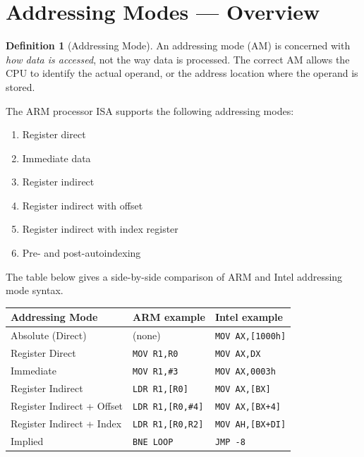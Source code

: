 \documentclass[11pt, a4paper, notitlepage]{report}
\theoremstyle{definition}
\newtheorem{definition}[theorem]{Definition}
\theoremstyle{remark}
\theoremstyle{definition}
\begin{document}
\section{Addressing Modes --- Overview}

\begin{definition}[Addressing Mode]
\label{def:addressing-mode}
An addressing mode (AM) is concerned with \emph{how data is accessed}, not the way data is processed. The correct AM allows the CPU to identify the actual operand, or the address location where the operand is stored.
\end{definition}

The ARM processor ISA supports the following addressing modes:

\begin{enumerate}
  \item Register direct
  \item Immediate data
  \item Register indirect
  \item Register indirect with offset
  \item Register indirect with index register
  \item Pre- and post-autoindexing
\end{enumerate}

The table below gives a side-by-side comparison of ARM and Intel addressing mode syntax.

\begin{center}
\begin{tabular}{lll}
\toprule
\textbf{Addressing Mode} & \textbf{ARM example} & \textbf{Intel example} \\
\midrule
Absolute (Direct) & (none) & \texttt{MOV AX,[1000h]} \\
Register Direct & \texttt{MOV R1,R0} & \texttt{MOV AX,DX} \\
Immediate & \texttt{MOV R1,\#3} & \texttt{MOV AX,0003h} \\
Register Indirect & \texttt{LDR R1,[R0]} & \texttt{MOV AX,[BX]} \\
Register Indirect + Offset & \texttt{LDR R1,[R0,\#4]} & \texttt{MOV AX,[BX+4]} \\
Register Indirect + Index & \texttt{LDR R1,[R0,R2]} & \texttt{MOV AH,[BX+DI]} \\
Implied & \texttt{BNE LOOP} & \texttt{JMP -8} \\
\bottomrule
\end{tabular}
\end{center}
\end{document}
